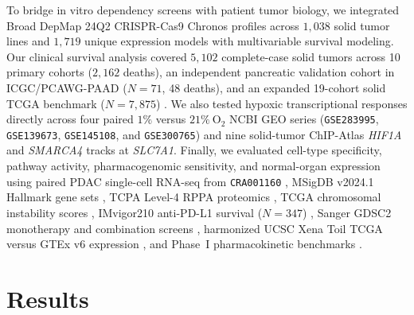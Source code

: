 \documentclass[10pt,twocolumn]{article}
\begin{document}
To bridge in vitro dependency screens with patient tumor biology, we integrated Broad DepMap 24Q2 CRISPR-Cas9 Chronos profiles across $1,038$ solid tumor lines and $1,719$ unique expression models \cite{depmap2021} with multivariable survival modeling. Our clinical survival analysis covered $5,102$ complete-case solid tumors across 10 primary cohorts ($2,162$ deaths), an independent pancreatic validation cohort in ICGC/PCAWG-PAAD ($N = 71$, 48 deaths), and an expanded 19-cohort solid TCGA benchmark ($N = 7,875$) \cite{tcga2018,cgga2021,curtis2012,raphael2017}. We also tested hypoxic transcriptional responses directly across four paired $1\%$ versus $21\%\ \text{O}_2$ NCBI GEO series (\texttt{GSE283995}, \texttt{GSE139673}, \texttt{GSE145108}, and \texttt{GSE300765}) and nine solid-tumor ChIP-Atlas \textit{HIF1A} and \textit{SMARCA4} tracks at \textit{SLC7A1}. Finally, we evaluated cell-type specificity, pathway activity, pharmacogenomic sensitivity, and normal-organ expression using paired PDAC single-cell RNA-seq from \texttt{CRA001160} \cite{peng2019,han2023}, MSigDB v2024.1 Hallmark gene sets \cite{liberzon2015}, TCPA Level-4 RPPA proteomics \cite{li2013,akbani2014}, TCGA chromosomal instability scores \cite{knijnenburg2018}, IMvigor210 anti-PD-L1 survival ($N = 347$) \cite{mariathasan2018}, Sanger GDSC2 monotherapy and combination screens \cite{jaaks2022,bashi2024}, harmonized UCSC Xena Toil TCGA versus GTEx v6 expression \cite{vivian2017}, and Phase~I pharmacokinetic benchmarks \cite{hamilton2023,desai2024}.

\section{Results}
\end{document}
